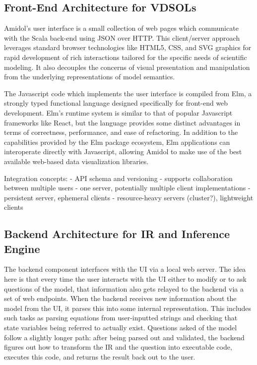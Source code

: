 \documentclass[11pt]{article}
\begin{document}
\subsection{Front-End Architecture for VDSOLs}

Amidol's user interface is a small collection of web pages which communicate with the Scala back-end using JSON over HTTP.  This client/server approach leverages standard browser technologies like HTML5, CSS, and SVG graphics for rapid development of rich interactions tailored for the specific needs of scientific modeling. It also decouples the concerns of visual presentation and manipulation from the underlying representations of model semantics.

The Javascript code which implements the user interface is compiled from Elm, a strongly typed functional language designed specifically for front-end web development. Elm's runtime system is similar to that of popular Javascript frameworks like React, but the language provides some distinct advantages in terms of correctness, performance, and ease of refactoring. In addition to the capabilities provided by the Elm package ecosystem, Elm applications can interoperate directly with Javascript, allowing Amidol to make use of the best available web-based data visualization libraries.

Integration concepts:
- API schema and versioning
- supports collaboration between multiple users
- one server, potentially multiple client implementations
- persistent server, ephemeral clients
- resource-heavy servers (cluster?), lightweight clients

\subsection{Backend Architecture for IR and Inference Engine}

The backend component interfaces with the UI via a local web server. The idea here is that every time the user interacts with the UI either to modify or to ask questions of the model, that information also gets relayed to the backend via a set of web endpoints. When the backend receives new information about the model from the UI, it parses this into some internal representation. This includes such tasks as parsing equations from user-inputted strings and checking that state variables being referred to actually exist. Questions asked of the model follow a slightly longer path: after being parsed out and validated, the backend figures out how to transform the IR and the question into executable code, executes this code, and returns the result back out to the user.
\end{document}
